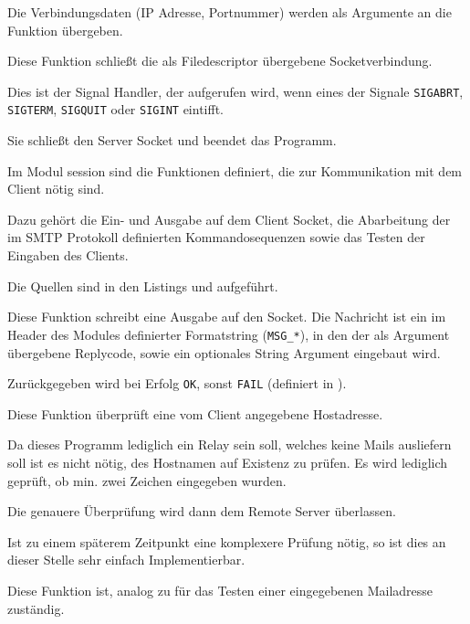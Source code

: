 Die Verbindungsdaten (IP Adresse, Portnummer) werden als Argumente an die Funktion \"{u}bergeben.

\label{fn:quit_remote_conn}
Diese Funktion schließt die als Filedescriptor \"{u}bergebene Socketverbindung.

\label{fn:sig_abrt_conn}
Dies ist der Signal Handler, der aufgerufen wird, wenn eines der Signale \texttt{SIGABRT}, \texttt{SIGTERM}, \texttt{SIGQUIT} oder \texttt{SIGINT} eintifft. 

Sie schließt den Server Socket und beendet das Programm.





\label{mod:session}
Im Modul session sind die Funktionen definiert, die zur Kommunikation mit dem Client n\"{o}tig sind. 

Dazu geh\"{o}rt die Ein- und Ausgabe auf dem Client Socket, die Abarbeitung der im SMTP Protokoll definierten Kommandosequenzen sowie das Testen der Eingaben des Clients.

Die Quellen sind in den Listings  und  aufgef\"{u}hrt.

\label{fn:write_client_msg}
Diese Funktion schreibt eine Ausgabe auf den Socket. Die Nachricht ist ein im Header des Modules  definierter Formatstring (\texttt{MSG\_*}), in den der als Argument \"{u}bergebene Replycode, sowie ein optionales String Argument eingebaut wird.

Zur\"{u}ckgegeben wird bei Erfolg \texttt{OK}, sonst \texttt{FAIL} (definiert in ).

\label{fn:check_addr}
Diese Funktion \"{u}berpr\"{u}ft eine vom Client angegebene Hostadresse. 

Da dieses Programm lediglich ein Relay sein soll, welches keine Mails ausliefern soll ist es nicht n\"{o}tig, des Hostnamen auf Existenz zu pr\"{u}fen. Es wird lediglich gepr\"{u}ft, ob min. zwei Zeichen eingegeben wurden. 

Die genauere \"{U}berpr\"{u}fung wird dann dem Remote Server \"{u}berlassen.

Ist zu einem sp\"{a}terem Zeitpunkt eine komplexere Pr\"{u}fung n\"{o}tig, so ist dies an dieser Stelle sehr einfach Implementierbar.

\label{fn:check_mail}
Diese Funktion ist, analog zu  f\"{u}r das Testen einer eingegebenen Mailadresse zust\"{a}ndig. 

